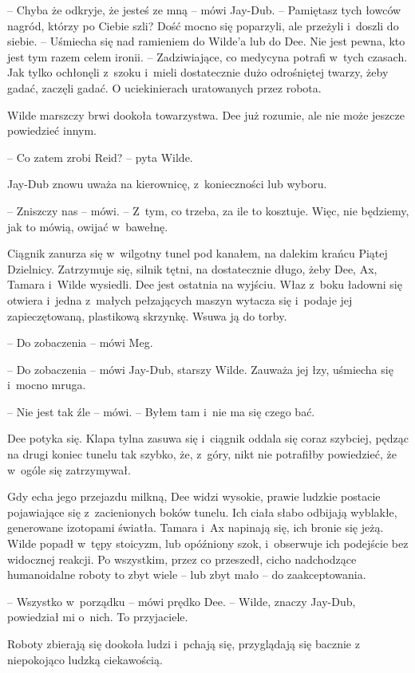\documentclass[oneside,polish,11pt,sfheadings]{mwbk}
\begin{document}
-- Chyba że odkryje, że jesteś ze mną -- mówi Jay-Dub. -- Pamiętasz tych
łowców nagród, którzy po Ciebie szli? Dość mocno się poparzyli, ale
przeżyli i~doszli do siebie. -- Uśmiecha się nad ramieniem do Wilde'a lub
do Dee. Nie jest pewna, kto jest tym razem celem ironii. -- Zadziwiające,
co medycyna potrafi w~tych czasach. Jak tylko ochłonęli z~szoku i~mieli
dostatecznie dużo odrośniętej twarzy, żeby gadać, zaczęli gadać. O
uciekinierach uratowanych przez robota.

Wilde marszczy brwi dookoła towarzystwa. Dee już rozumie, ale nie może
jeszcze powiedzieć innym.

-- Co zatem zrobi Reid? -- pyta Wilde.

Jay-Dub znowu uważa na kierownicę, z~konieczności lub wyboru.

-- Zniszczy nas -- mówi. -- Z~tym, co trzeba, za ile to kosztuje. Więc, nie będziemy, jak to mówią, owijać w~bawełnę.

Ciągnik zanurza się w~wilgotny tunel pod kanałem, na dalekim krańcu
Piątej Dzielnicy. Zatrzymuje się, silnik tętni, na dostatecznie długo,
żeby Dee, Ax, Tamara i~Wilde wysiedli. Dee jest ostatnia na wyjściu.
Właz z~boku ładowni się otwiera i~jedna z~małych pełzających maszyn
wytacza się i~podaje jej zapieczętowaną, plastikową skrzynkę. Wsuwa ją
do torby.

-- Do zobaczenia -- mówi Meg.

-- Do zobaczenia -- mówi Jay-Dub, starszy Wilde. Zauważa jej łzy, uśmiecha
się i~mocno mruga.

-- Nie jest tak źle -- mówi. -- Byłem tam i~nie ma się czego bać.

Dee potyka się. Klapa tylna zasuwa się i~ciągnik oddala się coraz
szybciej, pędząc na drugi koniec tunelu tak szybko, że, z~góry, nikt nie
potrafiłby powiedzieć, że w~ogóle się zatrzymywał.

Gdy echa jego przejazdu milkną, Dee widzi wysokie, prawie ludzkie
postacie pojawiające się z~zacienionych boków tunelu. Ich ciała słabo
odbijają wyblakłe, generowane izotopami światła. Tamara i~Ax napinają
się, ich bronie się jeżą. Wilde popadł w~tępy stoicyzm, lub opóźniony
szok, i~obserwuje ich podejście bez widocznej reakcji. Po wszystkim,
przez co przeszedł, cicho nadchodzące humanoidalne roboty to zbyt wiele
-- lub zbyt mało -- do zaakceptowania.

-- Wszystko w~porządku -- mówi prędko Dee. -- Wilde, znaczy Jay-Dub,
powiedział mi o~nich. To przyjaciele.

Roboty zbierają się dookoła ludzi i~pchają się, przyglądają się bacznie
z niepokojąco ludzką ciekawością.
\end{document}
